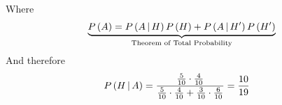 \documentclass[14pt,fleqn]{extarticle}
\begin{document}
\begin{question}
\begin{step}
        Where 
        \[\underbrace{P\left( A\right) = P\left(A\,\vert\,H\right)P\left( H\right) + P\left(A\,\vert\,H'\right)P\left( H'\right)}_{\text{Theorem of Total Probability}} \]
        And therefore
        \begin{align}
          P\left(H\,\vert\,A\right) &= \dfrac{\frac{5}{10}\cdot\frac{4}{10}}
          {\frac{5}{10}\cdot\frac{4}{10} + \frac{3}{10}\cdot\frac{6}{10} } = \dfrac{10}{19}
        \end{align}    
\end{step}
\end{question}
\end{document}
